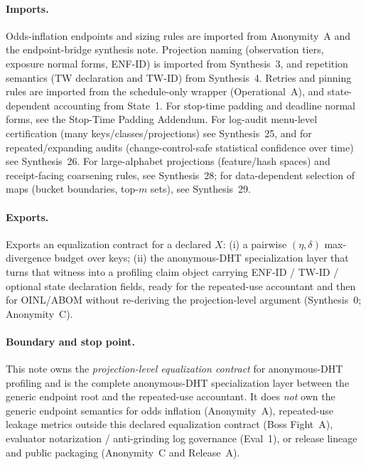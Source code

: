 \documentclass[11pt]{article}
\begin{document}
\paragraph{Imports.}
Odds-inflation endpoints and sizing rules are imported from Anonymity~A and the endpoint-bridge synthesis note.\cite{series:oddsinflation,series:endpointbridge}
Projection naming (observation tiers, exposure normal forms, ENF-ID) is imported from Synthesis~3, and repetition semantics (TW declaration and TW-ID) from Synthesis~4.\cite{series:traceifaces,series:threatwindows}
Retries and pinning rules are imported from the schedule-only wrapper (Operational~A), and state-dependent accounting from State~1.\cite{series:operationalA,series:state1}
For stop-time padding and deadline normal forms, see the Stop-Time Padding Addendum.\cite{series:stoptimeaddendum}
For log-audit menu-level certification (many keys/classes/projections) see Synthesis~25, and for repeated/expanding audits (change-control-safe statistical confidence over time) see Synthesis~26.\cite{series:stataudit,series:anytimespend}
For large-alphabet projections (feature/hash spaces) and receipt-facing coarsening rules, see Synthesis~28; for data-dependent selection of maps (bucket boundaries, top-$m$ sets), see Synthesis~29.\cite{series:coarsening,series:selectiondiscipline}

\paragraph{Exports.}
Exports an equalization contract for a declared $X$:
(i) a pairwise $(\eta,\delta)$ max-divergence budget over keys;
(ii) the anonymous-DHT specialization layer that turns that witness into a profiling claim object carrying ENF-ID / TW-ID / optional state declaration fields, ready for the repeated-use accountant and then for OINL/ABOM without re-deriving the projection-level argument (Synthesis~0; Anonymity~C).\cite{series:contractobjects,series:abomoinl}

\paragraph{Boundary and stop point.}
This note owns the \emph{projection-level equalization contract} for anonymous-DHT profiling and is the complete anonymous-DHT specialization layer between the generic endpoint root and the repeated-use accountant.
It does \emph{not} own the generic endpoint semantics for odds inflation (Anonymity~A), repeated-use leakage metrics outside this declared equalization contract (Boss Fight~A), evaluator notarization / anti-grinding log governance (Eval~1), or release lineage and public packaging (Anonymity~C and Release~A).\cite{series:oddsinflation,series:bossfightA,series:eval1,series:abomoinl,series:releaseA}
\end{document}
